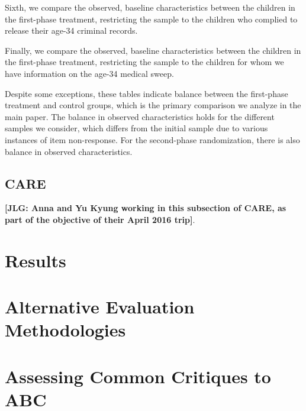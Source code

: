 \begin{appendices}


\noindent Sixth, we compare the observed, baseline characteristics between the children in the first-phase treatment, restricting the sample to the children who complied to release their age-34 criminal records.



\noindent Finally, we compare the observed, baseline characteristics between the children in the first-phase treatment, restricting the sample to the children for whom we have information on the age-34 medical sweep.



\noindent Despite some exceptions, these tables indicate balance between the first-phase treatment and control groups, which is the primary comparison we analyze in the main paper. The balance in observed characteristics holds for the different samples we consider, which differs from the initial sample due to various instances of item non-response. For the second-phase randomization, there is also balance in observed characteristics.

\subsection{CARE}

\noindent \textbf{[JLG: Anna and Yu Kyung working in this subsection of CARE, as part of the objective of their April 2016 trip]}.

\setcounter{figure}{0}  \renewcommand{\thefigure}{B.\arabic{figure}}
\setcounter{table}{0}   \renewcommand{\thetable}{B.\arabic{table}}
\section{Results}

\setcounter{figure}{0}  \renewcommand{\thefigure}{C.\arabic{figure}}
\setcounter{table}{0}   \renewcommand{\thetable}{C.\arabic{table}}
\section{Alternative Evaluation Methodologies} \label{appendix:methodology}

\section{Assessing Common Critiques to ABC}


\end{appendices}
